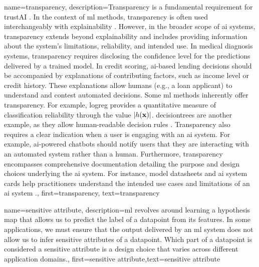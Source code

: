 {name={transparency},
	description={Transparency is a fundamental requirement for 
		\gls{trustAI} \cite{HLEGTrustworhtyAI}. In the context of \gls{ml} 
		methods, transparency is often used interchangeably with \gls{explainability} 
		\cite{gallese2023ai,JunXML2020}. However, in the broader scope of \gls{ai} 
		systems, transparency extends beyond \gls{explainability} and includes providing information 
		about the system’s limitations, reliability, and intended use. 
		In medical diagnosis systems, transparency requires disclosing the confidence level 
		for the \gls{prediction}s delivered by a trained \gls{model}. In credit scoring, 
		\gls{ai}-based lending decisions should be accompanied by explanations of 
		contributing factors, such as income level or credit history. These explanations 
		allow humans (e.g., a loan applicant) to understand and contest automated decisions. 
		Some \gls{ml} methods inherently offer transparency. For example, \gls{logreg} 
		provides a quantitative measure of \gls{classification} reliability through the value $|h({\bf x})|$. 
		\Gls{decisiontree}s are another example, as they allow human-readable decision rules \cite{rudin2019stop}.
		Transparency also requires a clear indication when a user is engaging with an \gls{ai} system. 
		For example, \gls{ai}-powered chatbots should notify users that they are interacting with an 
		automated system rather than a human. Furthermore, transparency encompasses comprehensive 
		documentation detailing the purpose and design choices underlying the \gls{ai} system. 
		For instance, \gls{model} datasheets \cite{DatasheetData2021} and \gls{ai} system cards \cite{10.1145/3287560.3287596} 
		help practitioners understand the intended use cases and limitations of an \gls{ai} system \cite{Shahriari2017}.},
	first={transparency}, text={transparency} 
}



{name={sensitive attribute},
	description={\gls{ml} revolves around learning a \gls{hypothesis} map that allows 
		us to predict the \gls{label} of a \gls{datapoint} from its \gls{feature}s. In some 
		applications, we must ensure that the output delivered by an \gls{ml} system does 
		not allow us to infer sensitive attributes of a \gls{datapoint}. Which part 
		of a \gls{datapoint} is considered a sensitive attribute is a design 
		choice that varies across different application domains.},
	first={sensitive attribute},text={sensitive attribute} 
}


